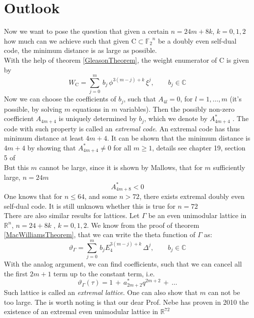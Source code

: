\documentclass[12pt]{article}
\theoremstyle{definition}
\numberwithin{equation}{theorem}
\numberwithin{figure}{theorem}
\newcommand{\Ftwo}{\ensuremath{\mathbb{F}_2}}
\newcommand{\simpleCodes}{\ensuremath{\mathrm{C}}}
\newcommand{\thetaFunction}[1]{\ensuremath{\vartheta_{#1}}}
\newcommand{\Real}{\ensuremath{\mathbb{R}}}
\newcommand{\Complex}{\ensuremath{\mathbb{C}}}
\begin{document}
\section{Outlook}
Now we want to pose the question that given a certain $n = 24m + 8k$, $k = 0,1,2$ how much can we achieve such that given $\simpleCodes \subset \Ftwo^n$ be a doubly even self-dual code, the minimum distance is as large as possible.\\
With the help of theorem \ref{GleasonTheorem}, the weight enumerator of $\simpleCodes$ is given by
\[
	W_{\simpleCodes} = \sum_{j = 0}^{m}\,b_j\,\phi^{3(m-j)+k} \,\xi^j, \qquad b_j \in \Complex
\]
Now we can choose the coefficients of $b_j$, such that $A_{4l} = 0$, for $l = 1,\ldots,m$ (it's possible, by solving $m$ equations in $m$ variables). Then the possibly non-zero coefficient $A_{4m + 4}$ is uniquely determined by $b_j$, which we denote by $A_{4m+4}^{*}$ . The code with such property is called an \emph{extremal code}. An extremal code has thus minimum distance at least $4m + 4$. It can be shown that the minimum distance is $4m + 4$ by showing that $A_{4m + 4}^* \neq 0$ for all $m \geq 1$, details see chapter 19, section 5 of \cite{macwilliams1977theory}\\
But this $m$ cannot be large, since it is shown by Mallows, that for $m$ sufficiently large, $n = 24m$
\[
	A_{4m + 8}^* < 0
\]
One knows that for $n \leq 64$, and some $n > 72$, there exists extremal doubly even self-dual code. It is still unknown whether this is true for $n = 72$\\
There are also similar results for lattices. Let $\Gamma$ be an even unimodular lattice in $\Real^n$, $n = 24 + 8k$ , $k = 0,1,2$. We know from the proof of theorem \ref{MacWilliamsTheorem}, that we can write the theta function of $\Gamma$ as:
\[
	\thetaFunction{\Gamma} = \sum_{j = 0}^m \, b_j E_4^{3(m - j) + k} \, \Delta^j,	\qquad b_j \in \Complex
\]
With the analog argument, we can find coefficients, such that we can cancel all the first $2m + 1$ term up to the constant term, i.e.
\[
	\thetaFunction{\Gamma}(\tau) = 1 \,+\, a_{2m + 2}^* q^{2m + 2}\, +\, \ldots
\]
Such lattice is called an \emph{extremal lattice}. One can also show that $m$ can not be too large. The is worth noting is that our dear Prof. Nebe has proven in 2010 the existence of an extremal even unimodular lattice in $\Real^{72}$

\newpage


\end{document}
